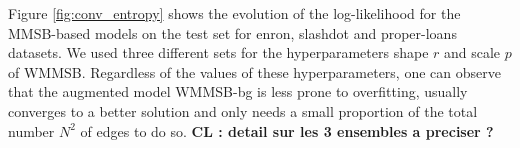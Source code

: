 Figure \ref{fig:conv_entropy} shows the evolution of the log-likelihood for the MMSB-based models on the test set for enron, slashdot and proper-loans datasets. We used three different sets for the hyperparameters shape $r$ and scale $p$ of WMMSB. Regardless of the values of these hyperparameters, one can observe that the augmented model WMMSB-bg is less prone to overfitting, usually converges to a better solution and only needs a small proportion of the total number $N^2$ of edges to do so.
\textbf{CL : detail sur les 3 ensembles a preciser ?} 

\begin{figure*}[h]
\centering
	
    \label{fig:conv_entropy}
\end{figure*}







